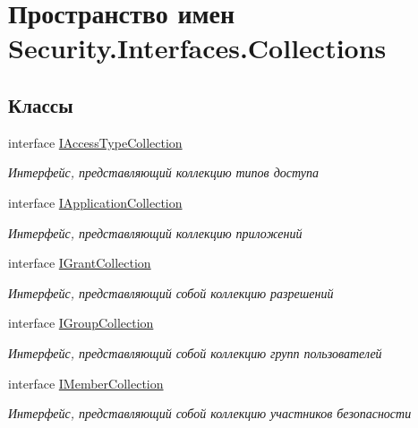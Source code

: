 \hypertarget{namespace_security_1_1_interfaces_1_1_collections}{}\section{Пространство имен Security.\+Interfaces.\+Collections}
\label{namespace_security_1_1_interfaces_1_1_collections}
\subsection*{Классы}
\begin{DoxyCompactItemize}
\item 
interface \hyperlink{interface_security_1_1_interfaces_1_1_collections_1_1_i_access_type_collection}{I\+Access\+Type\+Collection}
\begin{DoxyCompactList}\small\item\em Интерфейс, представляющий коллекцию типов доступа \end{DoxyCompactList}\item 
interface \hyperlink{interface_security_1_1_interfaces_1_1_collections_1_1_i_application_collection}{I\+Application\+Collection}
\begin{DoxyCompactList}\small\item\em Интерфейс, представляющий коллекцию приложений \end{DoxyCompactList}\item 
interface \hyperlink{interface_security_1_1_interfaces_1_1_collections_1_1_i_grant_collection}{I\+Grant\+Collection}
\begin{DoxyCompactList}\small\item\em Интерфейс, представляющий собой коллекцию разрешений \end{DoxyCompactList}\item 
interface \hyperlink{interface_security_1_1_interfaces_1_1_collections_1_1_i_group_collection}{I\+Group\+Collection}
\begin{DoxyCompactList}\small\item\em Интерфейс, представляющий собой коллекцию групп пользователей \end{DoxyCompactList}\item 
interface \hyperlink{interface_security_1_1_interfaces_1_1_collections_1_1_i_member_collection}{I\+Member\+Collection}
\begin{DoxyCompactList}\small\item\em Интерфейс, представляющий собой коллекцию участников безопасности \end{DoxyCompactList}\item 

\end{DoxyCompactItemize}

